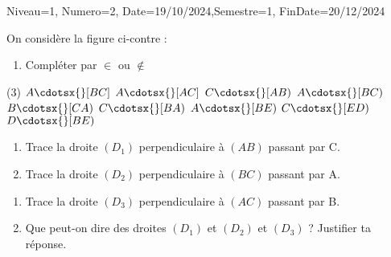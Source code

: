 \documentclass[a4paper,12pt]{article}
\begin{document}
\begin{Maquette}[DM]{Niveau=1, Numero=2, Date=19/10/2024,Semestre=1, FinDate=20/12/2024}

\begin{exercice}
\begin{minipage}{.66\linewidth}
On considère la figure ci-contre :
\begin{enumerate}
\item  Compléter par $\in$ ou $\notin$
\end{enumerate}
\end{minipage}%
\begin{minipage}{.33\linewidth}
\end{minipage}

\begin{tasks}(3)
\task $A\cdotsx{} [BC]$
\task $A\cdotsx{} [AC]$%
\task $C\cdotsx{} [AB)$ 
\task $A\cdotsx{} [BC)$
\task $B\cdotsx{} [CA)$
\task $C\cdotsx{} [BA)$
\task $A\cdotsx{} [BE)$
\task $C\cdotsx{} [ED)$
\task $D\cdotsx{} [BE)$
\end{tasks}
\end{exercice}

\begin{exercice}
\begin{minipage}{.7\linewidth}

\begin{enumerate}
\item Trace la droite $(D_{1})$ perpendiculaire à $(AB)$ passant par C.
\item Trace la droite $(D_{2})$ perpendiculaire à $(BC)$ passant par A.
\end{enumerate}
\end{minipage}%
\begin{minipage}{.3\linewidth}
\end{minipage}

\begin{enumerate}[start=3]
\item Trace la droite $(D_{3})$ perpendiculaire à $(AC)$ passant par B.
\item Que peut-on dire des droites $(D_{1})$ et $(D_{2})$ et $(D_{3})$ ? Justifier ta réponse.
\end{enumerate}




\end{exercice}
\end{Maquette}
\end{document}
